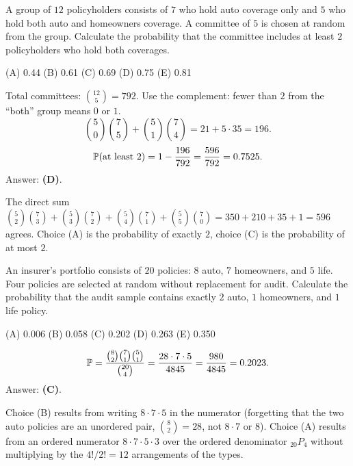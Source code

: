 \begin{example}
A group of $12$ policyholders consists of $7$ who hold auto coverage only and $5$ who hold
both auto and homeowners coverage. A committee of $5$ is chosen at random from the group.
Calculate the probability that the committee includes at least $2$ policyholders who hold
both coverages.
\par\smallskip\noindent (A) 0.44 \quad (B) 0.61 \quad (C) 0.69 \quad (D) 0.75 \quad (E) 0.81
\end{example}
\begin{solution}
Total committees: $\binom{12}{5} = 792$. Use the complement: fewer than $2$ from the
``both'' group means $0$ or $1$.
\[
\binom{5}{0}\binom{7}{5} + \binom{5}{1}\binom{7}{4} = 21 + 5\cdot 35 = 196 .
\]
\[
\mathbb{P}(\text{at least } 2) = 1 - \frac{196}{792} = \frac{596}{792} = 0.7525 .
\]
Answer: \textbf{(D)}.

The direct sum $\binom{5}{2}\binom{7}{3}+\binom{5}{3}\binom{7}{2}+\binom{5}{4}\binom{7}{1}+\binom{5}{5}\binom{7}{0}
= 350+210+35+1 = 596$ agrees. Choice (A) is the probability of exactly $2$, choice (C) is
the probability of at most $2$.
\end{solution}

\begin{example}
An insurer's portfolio consists of $20$ policies: $8$ auto, $7$ homeowners, and $5$ life.
Four policies are selected at random without replacement for audit. Calculate the probability
that the audit sample contains exactly $2$ auto, $1$ homeowners, and $1$ life policy.
\par\smallskip\noindent (A) 0.006 \quad (B) 0.058 \quad (C) 0.202 \quad (D) 0.263 \quad (E) 0.350
\end{example}
\begin{solution}
\[
\mathbb{P} = \frac{\binom{8}{2}\binom{7}{1}\binom{5}{1}}{\binom{20}{4}}
= \frac{28\cdot 7\cdot 5}{4845} = \frac{980}{4845} = 0.2023 .
\]
Answer: \textbf{(C)}.

Choice (B) results from writing $8\cdot 7\cdot 5$ in the numerator (forgetting that the
two auto policies are an unordered pair, $\binom{8}{2}=28$, not $8\cdot 7$ or $8$).
Choice (A) results from an ordered numerator $8\cdot7\cdot5\cdot3$ over the ordered
denominator ${}_{20}P_4$ without multiplying by the $4!/2! = 12$ arrangements of the types.
\end{solution}


